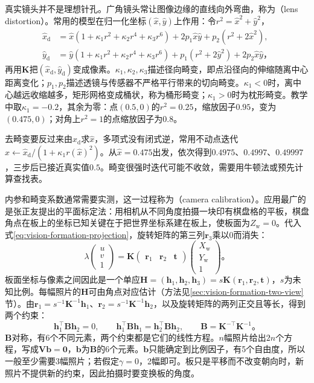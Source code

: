 真实镜头并不是理想针孔。广角镜头常让图像边缘的直线向外弯曲，称为（lens distortion）。常用的模型在归一化坐标$(\hat x,\hat y)$上作用：令$r^2=\hat x^2+\hat y^2$，
\begin{equation}
  \begin{aligned}
    \hat x_{\mathrm d}&=\hat x(1+\kappa_1r^2+\kappa_2r^4+\kappa_3r^6)+2p_1\hat x\hat y+p_2(r^2+2\hat x^2),\\
    \hat y_{\mathrm d}&=\hat y(1+\kappa_1r^2+\kappa_2r^4+\kappa_3r^6)+p_1(r^2+2\hat y^2)+2p_2\hat x\hat y\text{，}
  \end{aligned}
  \label{eq:vision-formation-distortion}
\end{equation}
再用$\bm K$把$(\hat x_{\mathrm d},\hat y_{\mathrm d})$变成像素。$\kappa_1,\kappa_2,\kappa_3$描述径向畸变，即点沿径向的伸缩随离中心距离变化；$p_1,p_2$描述透镜与传感器不严格平行带来的切向畸变。$\kappa_1<0$时，离中心越远收缩越多，矩形网格变成桶状，称为桶形畸变；$\kappa_1>0$时为枕形畸变。教学中取$\kappa_1=-0.2$，其余为零：点$(0.5,0)$的$r^2=0.25$，缩放因子$0.95$，变为$(0.475,0)$；对角上$r^2=1$的点缩放因子为$0.8$。

去畸变要反过来由$\hat x_{\mathrm d}$求$\hat x$，多项式没有闭式逆，常用不动点迭代$\hat x\gets\hat x_{\mathrm d}/(1+\kappa_1r(\hat x)^2)$。从$\hat x=0.475$出发，依次得到$0.4975$、$0.4997$、$0.49997$，三步后已接近真实值$0.5$。畸变很强时迭代可能不收敛，需要用牛顿法或预先计算查找表。

内参和畸变系数通常需要实测，这一过程称为（camera calibration）。应用最广的是张正友提出的平面标定法：用相机从不同角度拍摄一块印有棋盘格的平板，棋盘角点在板上的坐标已知关键在于把世界坐标系建在板上，使板面为$Z_{\mathrm w}=0$。代入式\eqref{eq:vision-formation-projection}，旋转矩阵的第三列$\bm r_3$乘以0而消失：
\[
  \lambda\begin{pmatrix}u\\v\\1\end{pmatrix}
  =\bm K\begin{pmatrix}\bm r_1&\bm r_2&\bm t\end{pmatrix}
  \begin{pmatrix}X_{\mathrm w}\\Y_{\mathrm w}\\1\end{pmatrix}\text{。}
\]
板面坐标与像素之间因此是一个单应$\bm H=(\bm h_1,\bm h_2,\bm h_3)=s\bm K(\bm r_1,\bm r_2,\bm t)$，$s$为未知比例。每幅照片的$\bm H$可由角点对应估计（方法见\ref{sec:vision-formation-two-view}节）。由$\bm r_1=s^{-1}\bm K^{-1}\bm h_1$、$\bm r_2=s^{-1}\bm K^{-1}\bm h_2$，以及旋转矩阵的两列正交且等长，得到两个约束：
\begin{equation}
  \bm h_1^\top\bm B\bm h_2=0,\qquad
  \bm h_1^\top\bm B\bm h_1=\bm h_2^\top\bm B\bm h_2,\qquad
  \bm B=\bm K^{-\top}\bm K^{-1}\text{。}
  \label{eq:vision-formation-zhang-constraints}
\end{equation}
$\bm B$对称，有6个不同元素，两个约束都是它们的线性方程。$n$幅照片给出$2n$个方程，写成$\bm V\bm b=\bm0$，$\bm b$为$\bm B$的6个元素。$\bm b$只能确定到比例因子，有5个自由度，所以一般至少需要3幅照片；若假定$\gamma=0$，2幅即可。板只是平移而不改变朝向时，新照片不提供新的约束，因此拍摄时要变换板的角度。

